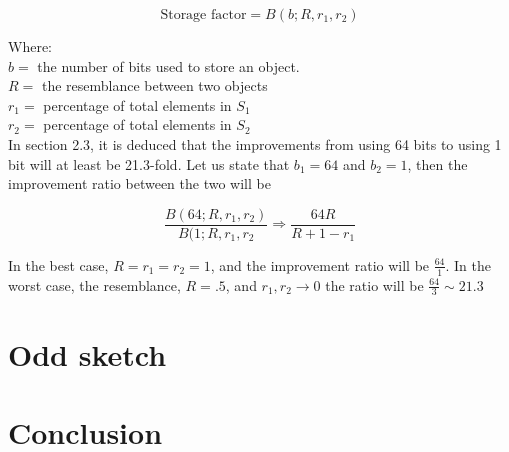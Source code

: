 \documentclass[a4paper,11pt]{article}
\begin{document}
\begin{equation}
    \text {Storage factor} = B(b;R,r_1,r_2)
    \label{eq:storagefactor}
\end{equation}

Where:\\
$b = $ the number of bits used to store an object. \\
$R = $ the resemblance between two objects \\
$r_1 = $ percentage of total elements in $S_1$ \\
$r_2 = $ percentage of total elements in $S_2$ \\

In \cite{article:bbit} section 2.3, it is deduced that the improvements from using 64 bits to using 1 bit will at least be 21.3-fold. Let us state that $b_1 = 64$ and $b_2 = 1$, then the improvement ratio between the two will be

\begin{equation}
    \frac{B(64;R,r_1,r_2)}{B(1;R,r_1,r_2} \Rightarrow \frac{64 R}{R + 1 - r_1}
    \label{eq:improvementratio}
\end{equation}

In the best case, $R = r_1 = r_2 = 1$, and the improvement ratio will be $\frac{64}{1}$. In the worst case, the resemblance, $R=.5$, and $r_1, r_2 \rightarrow 0$ the ratio will be $\frac{64}{3} \sim 21.3$

\section{Odd sketch}

\section{Conclusion}
\newpage

\end{document}
